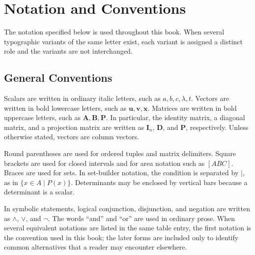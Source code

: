     \chapter*{Notation and Conventions}

    The notation specified below is used throughout this book. When several
    typographic variants of the same letter exist, each variant is assigned a
    distinct role and the variants are not interchanged.

    \section*{General Conventions}

    Scalars are written in ordinary italic letters, such as $a,b,c,\lambda,t$.
    Vectors are written in bold lowercase letters, such as
    $\mathbf{u},\mathbf{v},\mathbf{x}$. Matrices are written in bold uppercase
    letters, such as $\mathbf{A},\mathbf{B},\mathbf{P}$. In particular, the
    identity matrix, a diagonal matrix, and a projection matrix are written as
    $\mathbf{I}_n$, $\mathbf{D}$, and $\mathbf{P}$, respectively. Unless
    otherwise stated, vectors are column vectors.

    Round parentheses are used for ordered tuples and matrix delimiters. Square
    brackets are used for closed intervals and for area notation such as
    $[ABC]$. Braces are used for sets. In set-builder notation, the condition is
    separated by $\mid$, as in $\{x\in A\mid P(x)\}$. Determinants may be
    enclosed by vertical bars because a determinant is a scalar.

    In symbolic statements, logical conjunction, disjunction, and negation are
    written as $\land$, $\lor$, and $\neg$. The words ``and'' and ``or'' are
    used in ordinary prose. When several equivalent notations are listed in the
    same table entry, the first notation is the convention used in this book; the
    later forms are included only to identify common alternatives that a reader
    may encounter elsewhere.

    \vspace{0.5em}

